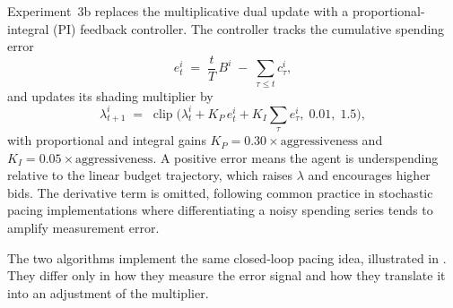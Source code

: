 Experiment~3b replaces the multiplicative dual update with a proportional-integral (PI) feedback controller. The controller tracks the cumulative spending error
\begin{equation}
e_t^i \;=\; \frac{t}{T}\,B^i \;-\; \sum_{\tau \leq t} c_{\tau}^i,
\label{eq:pi_error}
\end{equation}
and updates its shading multiplier by
\begin{equation}
\lambda_{t+1}^i \;=\; \operatorname{clip}\!\Big(\lambda_t^i + K_P \, e_t^i + K_I \sum_{\tau} e_{\tau}^i,\; 0.01,\; 1.5\Big),
\label{eq:pi_update}
\end{equation}
with proportional and integral gains $K_P = 0.30 \times \text{aggressiveness}$ and $K_I = 0.05 \times \text{aggressiveness}$. A positive error means the agent is underspending relative to the linear budget trajectory, which raises $\lambda$ and encourages higher bids. The derivative term is omitted, following common practice in stochastic pacing implementations where differentiating a noisy spending series tends to amplify measurement error.

The two algorithms implement the same closed-loop pacing idea, illustrated in . They differ only in how they measure the error signal and how they translate it into an adjustment of the multiplier.

